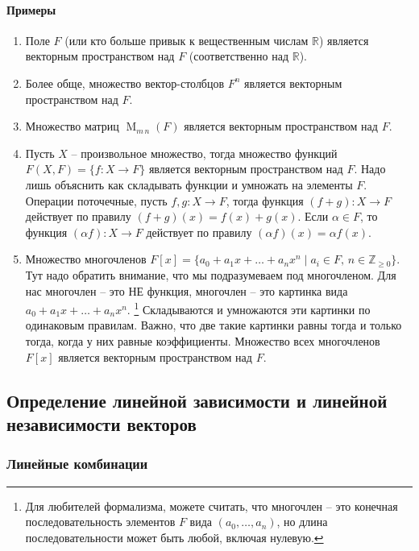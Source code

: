 \documentclass{article}
\begin{document}
\paragraph{Примеры}

\begin{enumerate}
	\item Поле $F$ (или кто больше привык к вещественным числам $\mathbb R$) является векторным пространством над $F$ (соответственно над $\mathbb R$).
	
	\item Более обще, множество вектор-столбцов $F^n$ является векторным пространством над $F$.
	
	\item Множество матриц $\operatorname{M}_{m\,n}(F)$ является векторным пространством над $F$.
	
	\item Пусть $X$ -- произвольное множество, тогда множество функций $F(X, F) = \{f\colon X\to F\}$ является векторным пространством над $F$.
	Надо лишь объяснить как складывать функции и умножать на элементы $F$.
	Операции поточечные, пусть $f,g\colon X\to F$, тогда функция $(f+g)\colon X\to F$ действует по правилу $(f+g)(x) = f(x) + g(x)$.
	Если $\alpha \in F$, то функция $(\alpha f)\colon X\to F$ действует по правилу $(\alpha f)(x) = \alpha f(x)$.
	
	\item Множество многочленов $F[x] = \{a_0+a_1x + \ldots + a_n x^n\mid a_i \in F,\,n\in \mathbb Z_{\geqslant 0}\}$.
	Тут надо обратить внимание, что мы подразумеваем под многочленом.
	Для нас многочлен -- это НЕ функция, многочлен -- это картинка вида $a_0 + a_1 x + \ldots + a_n x^n$.%
	\footnote{Для любителей формализма, можете считать, что многочлен -- это конечная последовательность элементов $F$ вида $(a_0,\ldots,a_n)$, но длина последовательности может быть любой, включая нулевую.}
	Складываются и умножаются эти картинки по одинаковым правилам.
	Важно, что две такие картинки равны тогда и только тогда, когда у них равные коэффициенты.
	Множество всех многочленов $F[x]$ является векторным пространством над $F$.
\end{enumerate}

\subsection*{Определение линейной зависимости и линейной независимости векторов}

\subsubsection*{Линейные комбинации}
\end{document}
